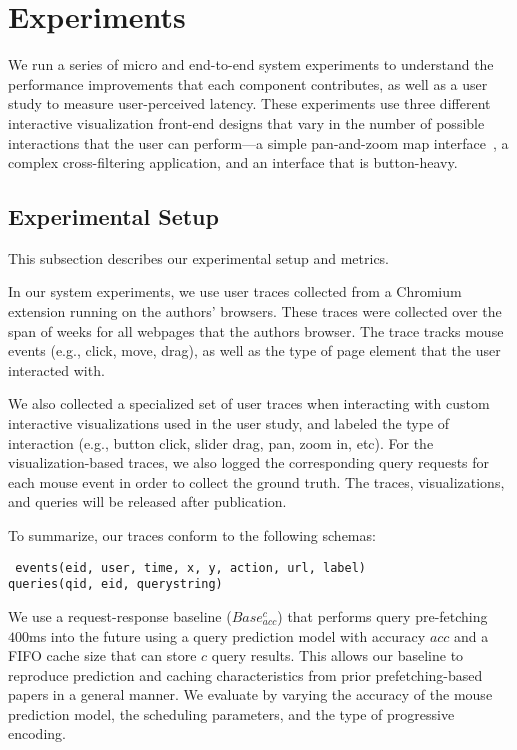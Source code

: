 

\section{Experiments}
\label{sec:experiments}

We run a series of micro and end-to-end system experiments to understand the performance improvements that each component contributes, as well as a user study to measure user-perceived latency.  These experiments use three different interactive visualization front-end designs that vary in the number of possible interactions that the user can perform---a simple pan-and-zoom map interface~\cite{}, a complex cross-filtering application, and an interface that is button-heavy.



\subsection{Experimental Setup}
This subsection describes our experimental setup and metrics.

In our system experiments, we use  user traces collected from a Chromium extension running on the authors' browsers.  These traces were collected over the span of  weeks for all webpages that the authors browser.  The trace tracks mouse events (e.g., click, move, drag), as well as the type of page element that the user interacted with. 

We also collected a specialized set of user traces when interacting with custom interactive visualizations used in the user study, and labeled the type of interaction (e.g., button click, slider drag, pan, zoom in, etc).  For the visualization-based traces, we also logged the corresponding query requests for each mouse event in order to collect the ground truth.  The traces, visualizations, and queries will be released after publication.

To summarize, our traces conform to the following schemas:
{\small \begin{verbatim}
 events(eid, user, time, x, y, action, url, label)
queries(qid, eid, querystring)
\end{verbatim}}

We use a request-response baseline ($Base_{acc}^{c}$) that performs query pre-fetching $400$ms into the future using a query prediction model with accuracy $acc$ and a FIFO cache size that can store $c$ query results.   This allows our baseline to reproduce prediction and caching characteristics from prior prefetching-based papers in a general manner.  We evaluate \sys by varying the accuracy of the mouse prediction model, the scheduling parameters, and the type of progressive encoding.  

